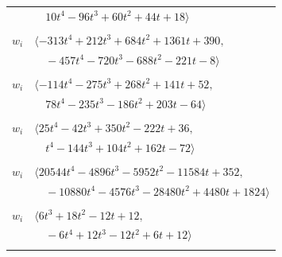 \documentclass[11pt]{article}
\begin{document}
\begin{longtable}{@{}ll@{}}
 & $\quad 10t^{4}-96t^{3}+60t^{2}+44t+18\rangle$\\
\addlinespace[2pt]
\multicolumn{2}{@{}p{0.97\textwidth}@{}}{$i=77$, $D_i=1$, $\rho_{ij}$: $1{:}1, \allowbreak 7{:}1, \allowbreak 10{:}1, \allowbreak 12{:}3, \allowbreak 18{:}1, \allowbreak 21{:}3, \allowbreak 24{:}1, \allowbreak 25{:}3, \allowbreak 34{:}2, \allowbreak 35{:}1, \allowbreak 41{:}1, \allowbreak 42{:}1, \allowbreak 45{:}3, \allowbreak 51{:}1, \allowbreak 55{:}2, \allowbreak 56{:}1, \allowbreak 59{:}2, \allowbreak 60{:}3, \allowbreak 67{:}1, \allowbreak 71{:}1, \allowbreak 73{:}3, \allowbreak 74{:}2, \allowbreak 81{:}2$}\\
$w_i$ & $\langle -313t^{4}+212t^{3}+684t^{2}+1361t+390,$\\
 & $\quad -457t^{4}-720t^{3}-688t^{2}-221t-8\rangle$\\
\addlinespace[2pt]
\multicolumn{2}{@{}p{0.97\textwidth}@{}}{$i=78$, $D_i=1$, $\rho_{ij}$: $7{:}1, \allowbreak 10{:}2, \allowbreak 16{:}3, \allowbreak 25{:}3, \allowbreak 30{:}3, \allowbreak 31{:}1, \allowbreak 32{:}3, \allowbreak 34{:}1, \allowbreak 37{:}2, \allowbreak 43{:}1, \allowbreak 46{:}3, \allowbreak 49{:}1, \allowbreak 53{:}3, \allowbreak 64{:}2$}\\
$w_i$ & $\langle -114t^{4}-275t^{3}+268t^{2}+141t+52,$\\
 & $\quad 78t^{4}-235t^{3}-186t^{2}+203t-64\rangle$\\
\addlinespace[2pt]
\multicolumn{2}{@{}p{0.97\textwidth}@{}}{$i=79$, $D_i=1$, $\rho_{ij}$: $0{:}2, \allowbreak 8{:}2, \allowbreak 16{:}1, \allowbreak 22{:}2, \allowbreak 26{:}1, \allowbreak 27{:}3, \allowbreak 35{:}2, \allowbreak 36{:}2, \allowbreak 38{:}3, \allowbreak 39{:}2, \allowbreak 48{:}3, \allowbreak 51{:}1, \allowbreak 55{:}2$}\\
$w_i$ & $\langle 25t^{4}-42t^{3}+350t^{2}-222t+36,$\\
 & $\quad t^{4}-144t^{3}+104t^{2}+162t-72\rangle$\\
\addlinespace[2pt]
\multicolumn{2}{@{}p{0.97\textwidth}@{}}{$i=80$, $D_i=2$, $e_i=0$, $\rho_{ij}$: $1{:}2, \allowbreak 3{:}1, \allowbreak 6{:}3, \allowbreak 8{:}2, \allowbreak 10{:}1, \allowbreak 21{:}3, \allowbreak 22{:}2, \allowbreak 25{:}2, \allowbreak 27{:}1, \allowbreak 30{:}1, \allowbreak 32{:}1, \allowbreak 38{:}3, \allowbreak 39{:}1, \allowbreak 41{:}3, \allowbreak 48{:}2, \allowbreak 53{:}1$}\\
$w_i$ & $\langle 20544t^{4}-4896t^{3}-5952t^{2}-11584t+352,$\\
 & $\quad -10880t^{4}-4576t^{3}-28480t^{2}+4480t+1824\rangle$\\
\addlinespace[2pt]
\multicolumn{2}{@{}p{0.97\textwidth}@{}}{$i=81$, $D_i=1$, $\rho_{ij}$: $4{:}2, \allowbreak 17{:}2, \allowbreak 34{:}2, \allowbreak 38{:}2, \allowbreak 51{:}2, \allowbreak 57{:}2, \allowbreak 66{:}2, \allowbreak 77{:}2$}\\
$w_i$ & $\langle 6t^{3}+18t^{2}-12t+12,$\\
 & $\quad -6t^{4}+12t^{3}-12t^{2}+6t+12\rangle$\\
\addlinespace[2pt]
\end{longtable}
\endgroup
\end{document}
